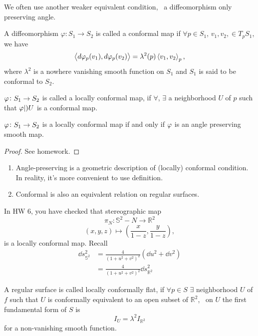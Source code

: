 We often use another weaker equivalent condition, \ie\ a diffeomorphism 
only preserving angle.
\begin{definition}
    A diffeomorphism \(\varphi\colon S_1\to S_2\) is called a conformal
    map if \(\forall p \in S_1\), \(v_1, v_2, \in T_p S_1\), we 
    have 
    \[
        \left\langle d\varphi_p(v_1),d\varphi_p(v_2)\right\rangle=
        \lambda^2(p)\left\langle v_1,v_2\right\rangle_p,
    \]
    where \(\lambda^2\) is a nowhere vanishing smooth function on \(S_1\)
    and \(S_1\) is said to be conformal to \(S_2\).
\end{definition}
\begin{definition}
    \(\varphi\colon S_1\to S_2\) is called a locally conformal map,
    if \(\forall\), \(\exists\) a neighborhood \(U\) of \(p\) such
    that  \(\varphi|)U\) is a conformal map.
\end{definition}
\begin{proposition}
    \(\varphi \colon S_1\to S_2\) is a locally conformal map if and only 
    if \(\varphi\) is an angle preserving smooth map.
\end{proposition}
\begin{proof}
    See homework.
\end{proof}
\begin{remark}
    \begin{enumerate}[(1)]
        \item Angle-preserving is a geometric description
        of (locally) conformal condition. In reality, it's more convenient
        to use definition.
        \item Conformal is also an equivalent relation on regular surfaces.
    \end{enumerate}
\end{remark}
\begin{example}
    In HW 6, you have checked that stereographic map
    \[
        \pi_N\colon \mathbb{S}^2-{N}\to \mathbb{R}^2   
    \]
    \[
        (x,y,z)\mapsto (\frac{x}{1-z},\frac{y}{1-z})    ,
    \]
    is a locally conformal map.
    Recall 
    \begin{align*}
        \dd s_{\mathbb{S}^2}^2&=\frac{4}{(1+u^2+v^2)^2}\left(
            \dd u^2+\dd v^2
        \right)\\
        &=\frac{4}{(1+u^2+v^2)^2}\dd s_{\mathbb{R}^2}^2
    \end{align*}
\end{example}
\begin{definition}
    A regular surface is called locally conformally flat, if 
    \(\forall p\in S\) \(\exists\) neighborhood \(U\) of \(f\)
    such that \(U\) is conformally equivalent to an open subset
    of \(\mathbb{R}^2\), \ie\ on \(U\) the first fundamental form of 
    \(S\) is 
    \[
        I_U=\lambda^2I_{\mathbb{R}^2}    
    \]
    for a non-vanishing smooth function.
\end{definition}
